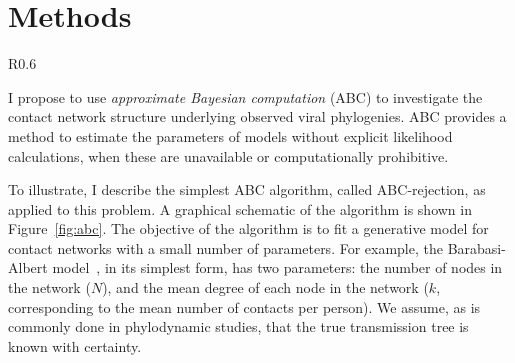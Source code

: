 \documentclass{article}
\begin{document}
\section{Methods}

\begin{wrapfigure}{R}{0.6\textwidth}
    \centering
    \caption{Schematic of phylodynamic ABC-rejection algorithm.}
    \label{fig:abc}
\end{wrapfigure}

I propose to use \emph{approximate Bayesian computation} (ABC) to investigate
the contact network structure underlying observed viral phylogenies. ABC
provides a method to estimate the parameters of models without explicit
likelihood calculations, when these are unavailable or computationally
prohibitive. 

To illustrate, I describe the simplest ABC algorithm, called ABC-rejection, as
applied to this problem. A graphical schematic of the algorithm is shown in
Figure~\ref{fig:abc}. The objective of the algorithm is to fit a generative
model for contact networks with a small number of parameters. For example, the
Barabasi-Albert model~\cite{albert2002statistical}, in its simplest form, has
two parameters: the number of nodes in the network ($N$), and the mean degree
of each node in the network ($k$, corresponding to the mean number of contacts
per person). We assume, as is commonly done in phylodynamic studies, that the
true transmission tree is known with certainty.
\end{document}
